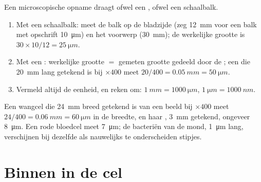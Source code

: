 \begin{method}\label{met:g10:cells-common-unit:measure}
Een microscopische opname draagt ofwel een , ofwel een
schaalbalk.
\begin{enumerate}
  \item Met een schaalbalk: meet de balk op de bladzijde (zeg
        \qty{12}{mm} voor een balk met opschrift \qty{10}{\micro m}) en
        het voorwerp (\qty{30}{mm}); de werkelijke grootte is
        $30 \times 10/12 =
        \qty{25}{\micro m}$.
  \item Met een : werkelijke grootte $=$ gemeten grootte
        gedeeld door de ; een  die \qty{20}{mm} lang
        getekend is bij $\times 400$ meet $20/400 = \qty{0.05}{mm} = \qty{50}{\micro m}$.
  \item Vermeld altijd de eenheid, en reken om: $\qty{1}{mm} =
        \qty{1000}{\micro m}$, $\qty{1}{\micro m} = \qty{1000}{nm}$.
\end{enumerate}
\end{method}

\begin{example}[Wangcellen]\label{ex:g10:cells-common-unit:cheek}
Een wangcel die \qty{24}{mm} breed getekend is van een beeld bij
$\times 400$ meet $24/400 = \qty{0.06}{mm} = \qty{60}{\micro m}$ in de
breedte, en haar , \qty{3}{mm} getekend, ongeveer
\qty{8}{\micro m}. Een rode bloedcel meet \qty{7}{\micro m}; de
bacteriën van de mond, \qty{1}{\micro m} lang, verschijnen bij dezelfde
 als nauwelijks te onderscheiden stipjes.
\end{example}

\section{Binnen in de cel}

